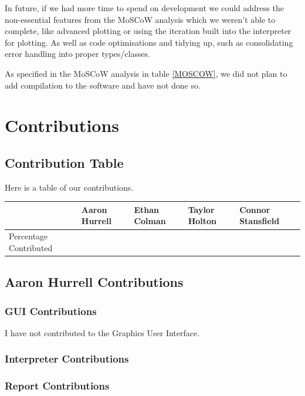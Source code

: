 \documentclass[a4paper, oneside, 11pt]{report}
\begin{document}
    In future, if we had more time to spend on development we could address the non-essential features from the MoSCoW analysis which we weren't able to complete, like advanced plotting or using the iteration built into the interpreter for plotting.
    As well as code optimisations and tidying up, such as consolidating error handling into proper types/classes.

    As specified in the MoSCoW analysis in table \ref{MOSCOW}, we did not plan to add compilation to the software and have not done so.

    
    


    \appendix
    \chapter{Contributions}
    \section{Contribution Table}
    Here is a table of our contributions. \\

    \begin{table}[h]
        \begin{tabular}{|l|l|l|l|l|}
            \hline
            & Aaron Hurrell & Ethan Colman & Taylor Holton & Connor Stansfield \\ \hline
            Percentage Contributed &               &              &               &                  \\ \hline
        \end{tabular}
    \end{table}

    \section{Aaron Hurrell Contributions}
    \subsection{GUI Contributions}
    I have not contributed to the Graphics User Interface.
    \subsection{Interpreter Contributions}
    \subsection{Report Contributions}
\end{document}
